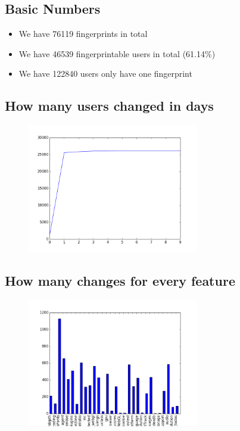 \documentclass[10pt, conference, compsocconf]{IEEEtran}
\begin{document}
\subsection{Basic Numbers}
\begin{itemize}\item We have 76119 fingerprints in total\item We have 46539 fingerprintable users in total (61.14\%)\item We have 122840 users only have one fingerprint \end{itemize}\subsection{How many users changed in days}
\begin{figure}[H]\centering\includegraphics[width=75mm,scale=0.5]{BasedonCookiechangebytime}\end{figure}\subsection{How many changes for every feature}
\begin{figure}[H]\centering\includegraphics[width=75mm,scale=0.5]{BasedonCookiefeaturechange}\end{figure}
\end{document}
